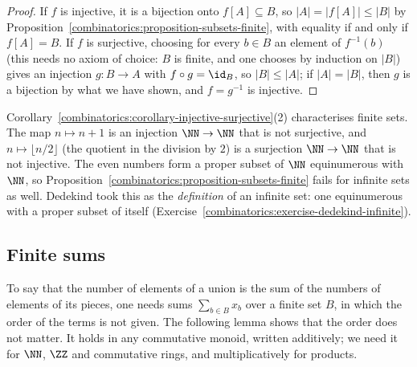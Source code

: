 \begin{proof}
If $f$ is injective, it is a bijection onto $f[A] \subseteq B$, so $|A| = |f[A]| \leq |B|$ by Proposition~\ref{combinatorics:proposition-subsets-finite}, with equality if and only if $f[A] = B$. If $f$ is
surjective, choosing for every $b \in B$ an element of $f^{-1}(b)$ (this needs no axiom of choice: $B$ is finite, and one chooses by induction on $|B|$) gives an injection $g \colon B \to A$ with
$f \circ g = \id_B$, so $|B| \leq |A|$; if $|A| = |B|$, then $g$ is a bijection by what we have shown, and $f = g^{-1}$ is injective.
\end{proof}

\begin{counterexample}\label{combinatorics:counterexample-dedekind}
Corollary~\ref{combinatorics:corollary-injective-surjective}(2) characterises finite sets. The map $n \mapsto n + 1$ is an injection $\NN \to \NN$ that is not surjective, and
$n \mapsto \lfloor n/2 \rfloor$ (the quotient in the division by $2$) is a surjection $\NN \to \NN$ that is not injective. The even numbers form a proper subset of $\NN$ equinumerous with
$\NN$, so Proposition~\ref{combinatorics:proposition-subsets-finite} fails for infinite sets as well. Dedekind took this as the \emph{definition} of an infinite set: one equinumerous with a proper subset
of itself (Exercise~\ref{combinatorics:exercise-dedekind-infinite}).
\end{counterexample}

\subsection{Finite sums}\label{combinatorics:subsection-finite-sums}

To say that the number of elements of a union is the sum of the numbers of elements of its pieces, one needs sums $\sum_{b \in B}x_b$ over a finite set $B$, in which the order of the terms is not
given. The following lemma shows that the order does not matter. It holds in any commutative monoid, written additively; we need it for $\NN$, $\ZZ$ and commutative rings, and multiplicatively for
products.

